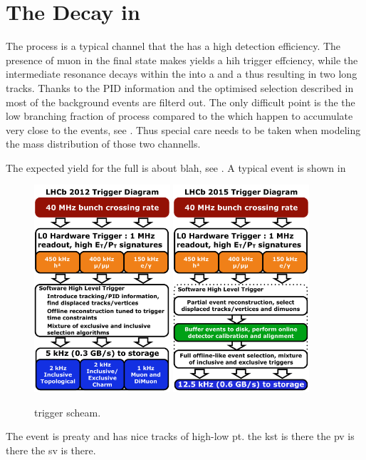 \section{The \BJpsiKst Decay in \lhcb}
\label{BspsiKst_at_lhcb}

The \BsJpsiKst process is a typical channel that the \lhcb has a high detection efficiency.
The presence of muon in the final state makes yields a hih trigger effciency, while the intermediate
\Kstar resonance decays within the \velo into a \kaon and a \pion thus resulting in two long tracks.
Thanks to the PID information and the optimised selection described in \secref{} most of the background
events are filterd out. The only difficult point is the the low branching fraction of \BsJpsiKst process
compared to the \BdJpsiKst which happen to accumulate very close to the \BsJpsiKst events, see \secref{}.
Thus special care needs to be taken when modeling the mass distribution of those two channells.

The \BsJpsiKst expected yield for the full \runone is about blah, see \equref{}.
A typical \BsJpsiKst event is  shown in \figref{}

\begin{figure}[t]
  \centering
  \includegraphics[width=0.45\textwidth]{Figures/Chapter2/LHCb_Trigger_RunIAlgDetail_May2015}
  \hspace{0.2cm}
  \includegraphics[width=0.45\textwidth]{Figures/Chapter2/LHCb_Trigger_RunII_May2015}
  \caption{\runone trigger scheam.}
  \label{run_one_trigger}
\end{figure}

The event is preaty and has nice tracks of high-low pt. the kst is there the pv is there the sv is there.
